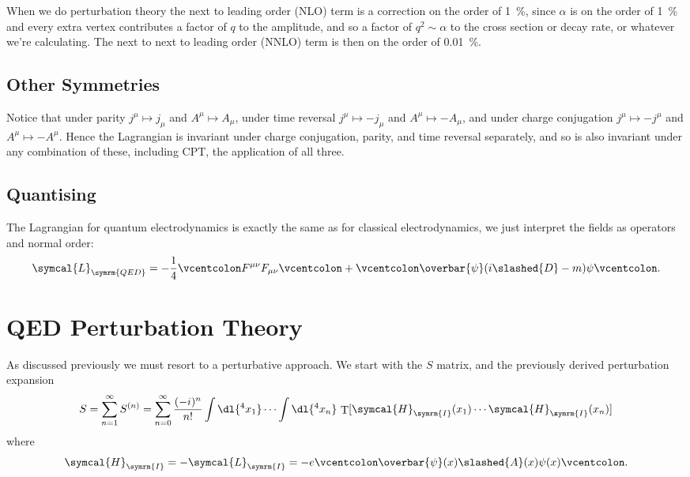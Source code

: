 \documentclass[fleqn]{NotesClass}
\newcommand{\lagrangianDensity}{\symcal{L}}
\newcommand{\hamiltonianDensity}{\symcal{H}}
\newcommand{\normalordering}[1]{\mathopen{\vcentcolon}{#1}\mathclose{\vcentcolon}}
\newcommand{\interaction}{\symrm{I}}
\DeclareMathOperator{\timeOrdering}{T}
\newcommand{\diracadjoint}[1]{\overbar{#1}}
\newcommand{\covariantDerivative}{D}
\begin{document}
    When we do perturbation theory the next to leading order (NLO) term is a correction on the order of \qty{1}{\percent}, since \(\alpha\) is on the order of \qty{1}{\percent} and every extra vertex contributes a factor of \(q\) to the amplitude, and so a factor of \(q^2 \sim \alpha\) to the cross section or decay rate, or whatever we're calculating.
    The next to next to leading order (NNLO) term is then on the order of \qty{0.01}{\percent}.
    
    \subsection{Other Symmetries}
    Notice that under parity \(j^\mu \mapsto j_\mu\) and \(A^\mu \mapsto A_\mu\), under time reversal \(j^\mu \mapsto -j_\mu\) and \(A^\mu \mapsto -A_\mu\), and under charge conjugation \(j^\mu \mapsto -j^\mu\) and \(A^\mu \mapsto -A^\mu\).
    Hence the Lagrangian is invariant under charge conjugation, parity, and time reversal separately, and so is also invariant under any combination of these, including CPT, the application of all three.
    
    \subsection{Quantising}
    The Lagrangian for quantum electrodynamics is exactly the same as for classical electrodynamics, we just interpret the fields as operators and normal order:
    \begin{equation}
        \lagrangianDensity_{\symrm{QED}} = -\frac{1}{4} \normalordering{F^{\mu\nu}F_{\mu\nu}} + \normalordering{\diracadjoint{\psi}(i\slashed{\covariantDerivative} - m)\psi}.
    \end{equation}
    
    \section{QED Perturbation Theory}
    As discussed previously we must resort to a perturbative approach.
    We start with the \(S\) matrix, and the previously derived perturbation expansion
    \begin{equation}
        S = \sum_{n=1}^{\infty}S^{(n)} = \sum_{n=0}^{\infty} \frac{(-i)^n}{n!} \int \dl{^4x_1} \dotsm \int \dl{^4x_n} \, \timeOrdering[\hamiltonianDensity_{\interaction}(x_1) \dotsm \hamiltonianDensity_{\interaction}(x_n)]
    \end{equation}
    where
    \begin{equation}
        \hamiltonianDensity_{\interaction} = -\lagrangianDensity_{\interaction} = -e\normalordering{\diracadjoint{\psi}(x)\slashed{A}(x)\psi(x)}.
    \end{equation}
    
\end{document}
